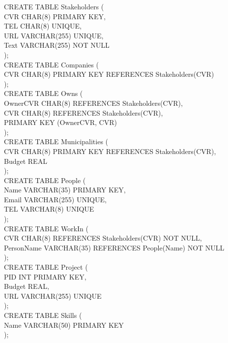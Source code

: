 \documentclass[12pt]{article}
\begin{document}
{CREATE TABLE Stakeholders (\\
  CVR CHAR(8) PRIMARY KEY,\\
  TEL CHAR(8) UNIQUE,\\
  URL VARCHAR(255) UNIQUE,\\
  Text VARCHAR(255) NOT NULL\\
);\\

CREATE TABLE Companies (\\
   CVR CHAR(8) PRIMARY KEY REFERENCES Stakeholders(CVR)\\
);\\

CREATE TABLE Owns (\\
  OwnerCVR CHAR(8) REFERENCES Stakeholders(CVR),\\
  CVR CHAR(8) REFERENCES Stakeholders(CVR),\\
  PRIMARY KEY (OwnerCVR, CVR)\\
);\\

CREATE TABLE Municipalities (\\
  CVR CHAR(8) PRIMARY KEY REFERENCES Stakeholders(CVR),\\
  Budget REAL\\
);\\

CREATE TABLE People (\\
  Name VARCHAR(35) PRIMARY KEY,\\
  Email VARCHAR(255) UNIQUE,\\
  TEL VARCHAR(8) UNIQUE\\
);\\

CREATE TABLE WorkIn (\\
  CVR CHAR(8) REFERENCES Stakeholders(CVR) NOT NULL,\\
  PersonName VARCHAR(35) REFERENCES People(Name) NOT NULL\\
);\\

CREATE TABLE Project (\\
  PID INT PRIMARY KEY,\\
  Budget REAL,\\
  URL VARCHAR(255) UNIQUE\\
);\\

CREATE TABLE Skills (\\
  Name VARCHAR(50) PRIMARY KEY\\
);\\

}
\end{document}
